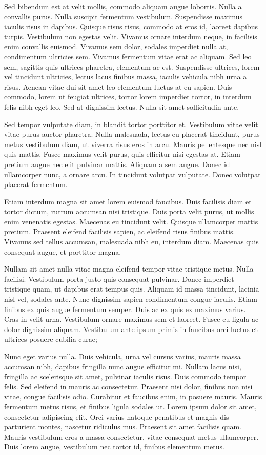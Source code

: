 Sed bibendum est at velit mollis, commodo aliquam augue lobortis. Nulla a
convallis purus. Nulla suscipit fermentum vestibulum. Suspendisse maximus
iaculis risus in dapibus. Quisque risus risus, commodo at eros id, laoreet
dapibus turpis. Vestibulum non egestas velit. Vivamus ornare interdum neque, in
facilisis enim convallis euismod. Vivamus sem dolor, sodales imperdiet nulla
at, condimentum ultricies sem. Vivamus fermentum vitae erat ac aliquam. Sed leo
sem, sagittis quis ultrices pharetra, elementum ac est. Suspendisse ultrices,
lorem vel tincidunt ultricies, lectus lacus finibus massa, iaculis vehicula
nibh urna a risus. Aenean vitae dui sit amet leo elementum luctus at eu sapien.
Duis commodo, lorem ut feugiat ultrices, tortor lorem imperdiet tortor, in
interdum felis nibh eget leo. Sed at dignissim lectus. Nulla sit amet
sollicitudin ante.

Sed tempor vulputate diam, in blandit tortor porttitor et. Vestibulum vitae
velit vitae purus auctor pharetra. Nulla malesuada, lectus eu placerat
tincidunt, purus metus vestibulum diam, ut viverra risus eros in arcu. Mauris
pellentesque nec nisl quis mattis. Fusce maximus velit purus, quis efficitur
nisi egestas at. Etiam pretium augue nec elit pulvinar mattis. Aliquam a sem
augue. Donec id ullamcorper nunc, a ornare arcu. In tincidunt volutpat
vulputate. Donec volutpat placerat fermentum.

Etiam interdum magna sit amet lorem euismod faucibus. Duis facilisis diam et
tortor dictum, rutrum accumsan nisi tristique. Duis porta velit purus, ut
mollis enim venenatis egestas. Maecenas eu tincidunt velit. Quisque ullamcorper
mattis pretium. Praesent eleifend facilisis sapien, ac eleifend risus finibus
mattis. Vivamus sed tellus accumsan, malesuada nibh eu, interdum diam. Maecenas
quis consequat augue, et porttitor magna.

Nullam sit amet nulla vitae magna eleifend tempor vitae tristique metus. Nulla
facilisi. Vestibulum porta justo quis consequat pulvinar. Donec imperdiet
tristique quam, ut dapibus erat tempus quis. Aliquam id massa tincidunt,
lacinia nisl vel, sodales ante. Nunc dignissim sapien condimentum congue
iaculis. Etiam finibus ex quis augue fermentum semper. Duis ac ex quis ex
maximus varius. Cras in velit urna. Vestibulum ornare maximus sem et laoreet.
Fusce eu ligula ac dolor dignissim aliquam. Vestibulum ante ipsum primis in
faucibus orci luctus et ultrices posuere cubilia curae;

Nunc eget varius nulla. Duis vehicula, urna vel cursus varius, mauris massa
accumsan nibh, dapibus fringilla nunc augue efficitur mi. Nullam lacus nisi,
fringilla ac scelerisque sit amet, pulvinar iaculis risus. Duis commodo tempor
felis. Sed eleifend in mauris ac consectetur. Praesent nisi dolor, finibus non
nisi vitae, congue facilisis odio. Curabitur et faucibus enim, in posuere
mauris. Mauris fermentum metus risus, et finibus ligula sodales ut. Lorem ipsum
dolor sit amet, consectetur adipiscing elit. Orci varius natoque penatibus et
magnis dis parturient montes, nascetur ridiculus mus. Praesent sit amet
facilisis quam. Mauris vestibulum eros a massa consectetur, vitae consequat
metus ullamcorper. Duis lorem augue, vestibulum nec tortor id, finibus
elementum metus.

